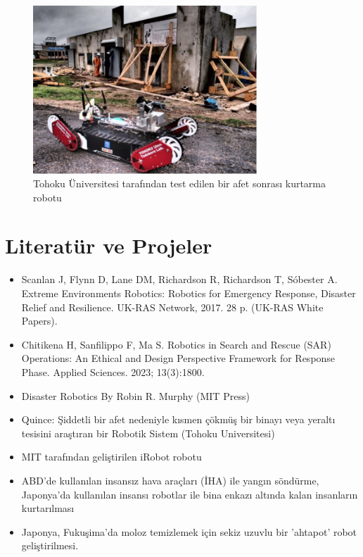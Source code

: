 \documentclass{article}
\begin{document}
\begin{figure}[h]
\centering
\includegraphics[width=0.75\textwidth]{Images/Resim1.jpg}
\caption{Tohoku Üniversitesi tarafından test edilen bir afet sonrası kurtarma robotu}
\end{figure}

\section*{Literatür ve Projeler}
\begin{itemize}
    \item Scanlan J, Flynn D, Lane DM, Richardson R, Richardson T, Sóbester A. Extreme Environments Robotics: Robotics for Emergency Response, Disaster Relief and Resilience. UK-RAS Network, 2017. 28 p. (UK-RAS White Papers).
    \item Chitikena H, Sanfilippo F, Ma S. Robotics in Search and Rescue (SAR) Operations: An Ethical and Design Perspective Framework for Response Phase. Applied Sciences. 2023; 13(3):1800.
    \item Disaster Robotics By Robin R. Murphy (MIT Press)
    \item Quince: Şiddetli bir afet nedeniyle kısmen çökmüş bir binayı veya yeraltı tesisini araştıran bir Robotik Sistem (Tohoku Universitesi)
    \item MIT tarafından geliştirilen iRobot robotu
    \item ABD'de kullanılan insansız hava araçları (İHA) ile yangın söndürme, Japonya'da kullanılan insansı robotlar ile bina enkazı altında kalan insanların kurtarılması
    \item Japonya, Fukuşima'da moloz temizlemek için sekiz uzuvlu bir 'ahtapot' robot geliştirilmesi.
\end{itemize}
\end{document}
